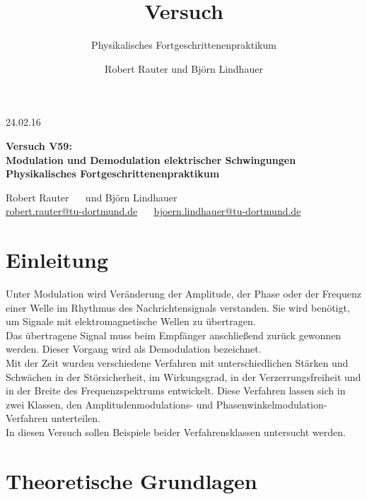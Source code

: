 \documentclass[]{scrartcl}
\title{Versuch \versuchnummer\\ \versuchname}
\subtitle{Physikalisches Fortgeschrittenenpraktikum}
\author{Robert Rauter und Björn Lindhauer}
\date{\versuchdatum}
\newcommand{\versuchnummer}{V59}
\newcommand{\versuchname}{Modulation und Demodulation elektrischer Schwingungen}
\newcommand{\versuchdatum}{24.02.16}
\begin{document}
\begin{titlepage}
{\large \versuchdatum}
\vspace{7cm}
\begin{center}
\textbf{\huge Versuch \versuchnummer:}\\
\vspace{0.5cm}
\textbf{\huge \versuchname}\\
\vspace{0.2cm}
\textbf{ Physikalisches Fortgeschrittenenpraktikum}\\
\vspace{9cm}

{\Large Robert Rauter \ \ \hspace{1.5cm} und \hspace{1.5cm} Björn Lindhauer}\\
{ \url{robert.rauter@tu-dortmund.de} \ \ \hspace{2cm} \url{bjoern.lindhauer@tu-dortmund.de}}
\end{center}
\end{titlepage}
\section{Einleitung}
Unter Modulation wird Veränderung der Amplitude, der Phase oder der Frequenz einer Welle im Rhythmus des Nachrichtensignals verstanden. Sie wird benötigt, um Signale mit elektromagnetische Wellen zu übertragen.\\
Das übertragene Signal muss beim Empfänger anschließend zurück gewonnen werden. Dieser Vorgang wird als Demodulation bezeichnet.\\ Mit der Zeit wurden verschiedene Verfahren mit unterschiedlichen Stärken und Schwächen in der Störsicherheit, im Wirkungsgrad, in der Verzerrungsfreiheit und in der Breite des Frequenzspektrums entwickelt. Diese Verfahren lassen sich in zwei Klassen, den Amplitudenmodulations- und Phasenwinkelmodulation- Verfahren unterteilen.\\
In diesen Versuch sollen Beispiele beider Verfahrensklassen untersucht werden.
\section{Theoretische Grundlagen}
\end{document}
